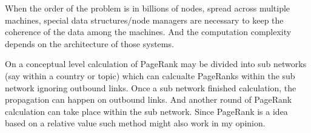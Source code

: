 \documentclass[10pt]{article}
\begin{document}
When the order of the problem is in billions of nodes, spread across multiple machines, special
data structures/node managers are necessary to keep the coherence of the data among the machines. 
And the computation complexity depends on the architecture of those systems.

On a conceptual level calculation of PageRank may be divided into sub networks (say within a country or
topic) which can calcualte PageRanks within the sub network ignoring outbound links. Once a sub
network finished calculation, the propagation can happen on outbound links. And another round of
PageRank calculation can take place within the sub network. Since PageRank is a
idea based on a relative value such method might also work in my opinion. 
\end{document}
